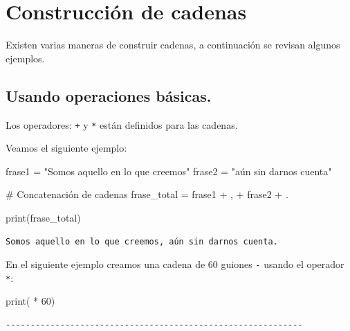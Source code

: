 \documentclass[
  spanish,
  letterpaper,
]{scrbook}
\newenvironment{Shaded}{\begin{snugshade}}{\end{snugshade}}
\newcommand{\BuiltInTok}[1]{\textcolor[rgb]{0.00,0.23,0.31}{#1}}
\newcommand{\CommentTok}[1]{\textcolor[rgb]{0.37,0.37,0.37}{#1}}
\newcommand{\DecValTok}[1]{\textcolor[rgb]{0.68,0.00,0.00}{#1}}
\newcommand{\NormalTok}[1]{\textcolor[rgb]{0.00,0.23,0.31}{#1}}
\newcommand{\OperatorTok}[1]{\textcolor[rgb]{0.37,0.37,0.37}{#1}}
\newcommand{\StringTok}[1]{\textcolor[rgb]{0.13,0.47,0.30}{#1}}
\theoremstyle{definition}
\theoremstyle{remark}
\begin{document}
\section{Construcción de cadenas}\label{construcciuxf3n-de-cadenas}

Existen varias maneras de construir cadenas, a continuación se revisan
algunos ejemplos.

\subsection{Usando operaciones
básicas.}\label{usando-operaciones-buxe1sicas.}

Los operadores: \texttt{+} y \texttt{*} están definidos para las
cadenas.

Veamos el siguiente ejemplo:

\begin{Shaded}
\begin{Highlighting}[]
\NormalTok{frase1 }\OperatorTok{=} \StringTok{"Somos aquello en lo que creemos"}
\NormalTok{frase2 }\OperatorTok{=} \StringTok{"aún sin darnos cuenta"}

\CommentTok{\# Concatenación de cadenas}
\NormalTok{frase\_total }\OperatorTok{=}\NormalTok{ frase1 }\OperatorTok{+} \StringTok{\textquotesingle{}, \textquotesingle{}} \OperatorTok{+}\NormalTok{ frase2 }\OperatorTok{+} \StringTok{\textquotesingle{}.\textquotesingle{}}

\BuiltInTok{print}\NormalTok{(frase\_total)}
\end{Highlighting}
\end{Shaded}

\begin{verbatim}
Somos aquello en lo que creemos, aún sin darnos cuenta.
\end{verbatim}

En el siguiente ejemplo creamos una cadena de 60 guiones \texttt{-}
usando el operador \texttt{*}:

\begin{Shaded}
\begin{Highlighting}[]
\BuiltInTok{print}\NormalTok{(}\StringTok{\textquotesingle{}{-}\textquotesingle{}} \OperatorTok{*} \DecValTok{60}\NormalTok{)}
\end{Highlighting}
\end{Shaded}

\begin{verbatim}
------------------------------------------------------------
\end{verbatim}
\end{document}
